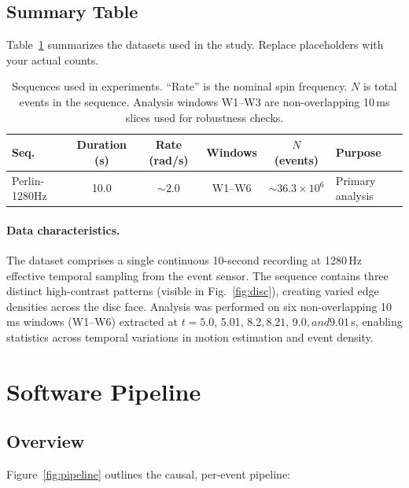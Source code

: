\subsection{Summary Table}
Table~\ref{tab:sequences} summarizes the datasets used in the study. Replace placeholders with your actual counts.

\begin{table}[H]
  \centering
  \caption{Sequences used in experiments. ``Rate'' is the nominal spin frequency. $N$ is total events in the sequence. Analysis windows W1--W3 are non-overlapping 10\,ms slices used for robustness checks.}
  \label{tab:sequences}
  \begin{tabular}{lccccl}
    \toprule
    \textbf{Seq.} & \textbf{Duration (s)} & \textbf{Rate (rad/s)} & \textbf{Windows} & \textbf{$N$ (events)} & \textbf{Purpose} \\
    \midrule
    Perlin-1280Hz & 10.0 & $\sim 2.0$ & W1--W6 & $\sim 36.3 \times 10^6$ & Primary analysis \\
    \bottomrule
  \end{tabular}
\end{table}

\paragraph{Data characteristics.}
The dataset comprises a single continuous 10-second recording at 1280\,Hz effective temporal sampling from the event sensor. The sequence contains three distinct high-contrast patterns (visible in Fig.~\ref{fig:disc}), creating varied edge densities across the disc face. Analysis was performed on six non-overlapping 10\,ms windows (W1--W6) extracted at $t = 5.0$, 5.01, 8.2$, 8.21$, 9.0$, and 9.01$\,s, enabling statistics across temporal variations in motion estimation and event density.

\section{Software Pipeline}
\label{sec:software}

\subsection{Overview}
Figure~\ref{fig:pipeline} outlines the causal, per-event pipeline:

